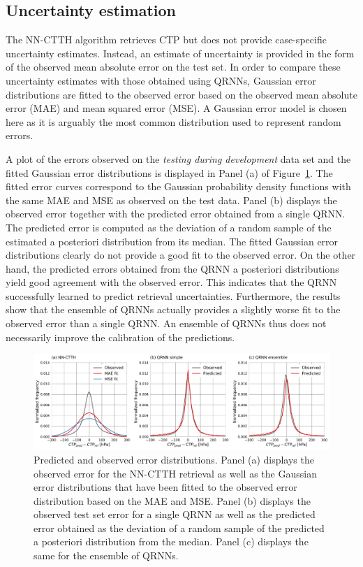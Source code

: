 \documentclass[journal abbreviation, manuscript]{copernicus}
\begin{document}
\subsection{Uncertainty estimation}

The NN-CTTH algorithm retrieves CTP but does not provide case-specific
uncertainty estimates. Instead, an estimate of uncertainty is provided in the
form of the observed mean absolute error on the test set. In order to compare
these uncertainty estimates with those obtained using QRNNs, Gaussian error
distributions are fitted to the observed error based on the observed mean
absolute error (MAE) and mean squared error (MSE). A Gaussian error model
is chosen here as it is arguably the most common distribution used to represent
random errors.

A plot of the errors observed on the \textit{testing during development} data
set and the fitted Gaussian error distributions is displayed in Panel (a) of
Figure~\ref{fig:error_fit}. The fitted error curves correspond to the Gaussian
probability density functions with the same MAE and MSE as observed on the test
data. Panel (b) displays the observed error together with the predicted error
obtained from a single QRNN. The predicted error is computed as the deviation of
a random sample of the estimated a posteriori distribution from its median. The
fitted Gaussian error distributions clearly do not provide a good fit to the
observed error. On the other hand, the predicted errors obtained from the QRNN a
posteriori distributions yield good agreement with the observed error. This
indicates that the QRNN successfully learned to predict retrieval uncertainties.
Furthermore, the results show that the ensemble of QRNNs actually provides a
slightly worse fit to the observed error than a single QRNN. An ensemble of
QRNNs thus does not necessarily improve the calibration of the predictions.

  \begin{figure}[hbpt!]
    \centering
    \includegraphics[width = 1.0\linewidth]{../plots/fig09.pdf}
    \caption{Predicted and observed error distributions. Panel (a)
      displays the observed error for the NN-CTTH retrieval as well as the
      Gaussian error distributions that have been fitted to the observed
      error distribution based on the MAE and MSE. Panel (b)
      displays the observed test set error for a single QRNN as well as the
      predicted error obtained as the deviation of a random sample of the
      predicted a posteriori distribution from the median. Panel (c) displays
      the same for the ensemble of QRNNs.}
    \label{fig:error_fit}
  \end{figure}
\end{document}
